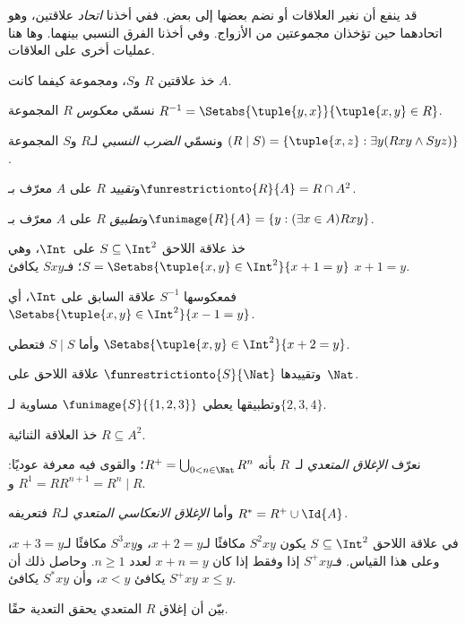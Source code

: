 \documentclass[../../../include/open-logic-section]{subfiles}
\begin{document}

قد ينفع أن نغير العلاقات أو نضم بعضها إلى بعض. ففي
 أخذنا \emph{اتحاد} علاقتين،
وهو اتحادهما حين تؤخذان مجموعتين من الأزواج. وفي
 أخذنا الفرق النسبي
بينهما. وها هنا عمليات أخرى على العلاقات.

\begin{defn}
خذ علاقتين $R$ و$S$، ومجموعة كيفما كانت $A$.

نسمّي \emph{معكوس} $R$ المجموعة $R^{-1} = \Setabs{\tuple{y, x}}{\tuple{x,
    y} \in R}$.

ونسمّي \emph{الضرب النسبي} لـ$R$ و$S$ المجموعة $(R \mid S) =
\{\tuple{x, z} : \exists y(Rxy \land Syz)\}$.

و\emph{تقييد} $R$ على $A$ معرّف بـ$\funrestrictionto{R}{A}= R
\cap A^2$.

و\emph{تطبيق} $R$ على $A$ معرّف بـ$\funimage{R}{A} = \{y :
(\exists x \in A)Rxy\}$.
\end{defn}

\begin{ex}
خذ علاقة اللاحق $S \subseteq \Int^2$ على~$\Int$، وهي
$S = \Setabs{\tuple{x, y} \in \Int^2}{x + 1 = y}$؛ فـ$Sxy$ يكافئ $x + 1 = y$.

فمعكوسها $S^{-1}$ علاقة السابق على $\Int$، أي
$\Setabs{\tuple{x,y}\in\Int^2}{x -1 =y}$.

وأما $S\mid S$ فتعطي
$ \Setabs{\tuple{x,y}\in\Int^2}{x + 2 =y}$.

وتقييدها $\funrestrictionto{S}{\Nat}$ علاقة اللاحق على~$\Nat$.

وتطبيقها يعطي $\funimage{S}{\{1,2,3\}}$ مساوية لـ$\{2, 3, 4\}$.
\end{ex}

\begin{defn}
خذ العلاقة الثنائية $R \subseteq A^2$.

نعرّف \emph{الإغلاق المتعدي} لـ~$R$ بأنه $R^+ = \bigcup_{0 < n \in
\Nat} R^n$؛ والقوى فيه معرفة عوديًا: $R^1 = R$ و$R^{n+1} = R^n
\mid R$.

وأما \emph{الإغلاق الانعكاسي المتعدي} لـ$R$ فتعريفه $R^* = R^+ \cup
\Id{A}$.
\end{defn}

\begin{ex}
في علاقة اللاحق $S \subseteq \Int^2$ يكون $S^2xy$ مكافئًا لـ$x + 2 =
y$، و$S^3xy$ مكافئًا لـ$x + 3 = y$، وعلى هذا القياس.
فـ$S^+xy$ إذا وفقط إذا كان $x + n = y$ لعدد $n \geq 1$.
وحاصل ذلك أن $S^+xy$ يكافئ $x < y$، وأن $S^*xy$ يكافئ $x \le
y$.
\end{ex}

\begin{prob}
بيّن أن إغلاق $R$ المتعدي يحقق التعدية حقًا.
\end{prob}
\end{document}
